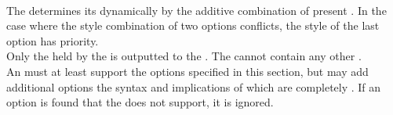  \\

The   determines its  dynamically by the additive combination of present . In the case where the style combination of two options conflicts, the style of the last option has priority. \\

Only the  held by the  is outputted to the . The   cannot contain any other .\\

An  must at least support the options specified in this section, but may add additional options the syntax and implications of which are completely . If an option is found that the  does not support, it is ignored. \\











